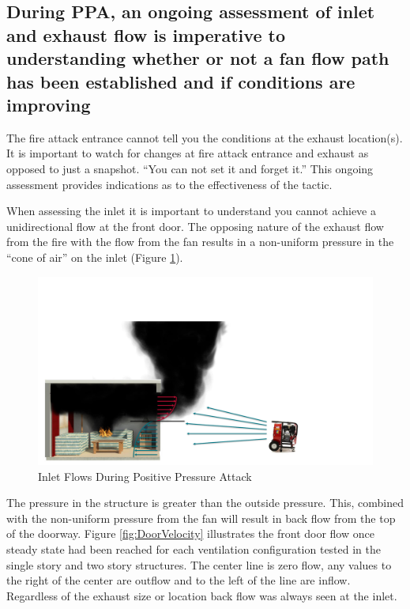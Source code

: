 \documentclass{article}
\begin{document}
\subsection{During PPA, an ongoing assessment of inlet and exhaust flow is imperative to understanding whether or not a fan flow path has been established and if conditions are improving} \label{sec:OngoingAssessment}
The fire attack entrance cannot tell you the conditions at the exhaust location(s). It is important to watch for changes at fire attack entrance and exhaust as opposed to just a snapshot. ``You can not set it and forget it.'' This ongoing assessment provides indications as to the effectiveness of the tactic. 

When assessing the inlet it is important to understand you cannot achieve a unidirectional flow at the front door. The opposing nature of the exhaust flow from the fire with the flow from the fan results in a non-uniform pressure in the “cone of air” on the inlet (Figure \ref{fig:FanAndDoorFlow}).

\begin{figure}[H]
	\centering
	\includegraphics[width = 6in]{0_Images/Tactical_Considerations/Ongoing_Assessment/FanandDoorFlow.pdf}
	\caption{Inlet Flows During Positive Pressure Attack}
	\label{fig:FanAndDoorFlow}
\end{figure}

The pressure in the structure is greater than the outside pressure. This, combined with the non-uniform pressure from the fan will result in back flow from the top of the doorway. Figure \ref{fig:DoorVelocity} illustrates the front door flow once steady state had been reached for each ventilation configuration tested in the single story and two story structures. The center line is zero flow, any values to the right of the center are outflow and to the left of the line are inflow. Regardless of the exhaust size or location back flow was always seen at the inlet.
\end{document}
